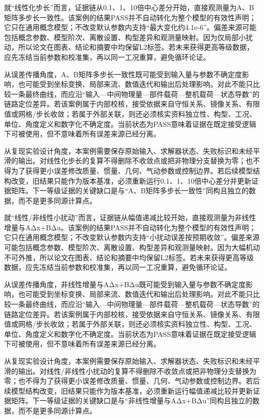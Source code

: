 \documentclass[UTF8,12pt,openany]{ctexbook}
\begin{document}
就“线性化步长”而言，证据链从0.1、1、10倍中心差分开始，直接观测量为A、B矩阵多步长一致性。该案例的结果PASS并不自动转化为整个模型的有效性声明；它只在通用概念模型；不改变默认参数内支持“最大变化约4.1e-6”。偏差来源可能包括概念参数、模型阶次、离散设置、构型差异和观测量映射。因为仅局部小扰动，所以论文在图表、结论和摘要中均保留L2标签。若未来获得更高等级数据，应先冻结当前参数和校准集，再以同一工况重算，避免循环论证。

从误差传播角度，A、B矩阵多步长一致性既可能受到输入量与参数不确定度影响，也可能受到坐标变换、局部来流、数值迭代和输出后处理影响。对此不能只比较一条最终曲线，而应沿“输入—中间物理量—部件载荷—整机载荷—状态导数”的链路定位差异。若该案例属于内部校核，接受依据来自守恒关系、镜像关系、有限值或网格/步长收敛；若属于外部关联，则还必须核实资料独立性、构型、工况、单位、角度定义和数字化不确定度。当前状态为PASS意味着证据在既定接受逻辑下可被使用，但不意味着所有误差来源已经分离。

从复现实验设计角度，本案例需要保存原始输入、求解器状态、失败标识和未经平滑的输出。对线性化步长的复算不得删除不收敛点或把非物理分支替换为零；也不得为了获得更小误差修改质量、惯量、几何、气动参数或控制边界。若后续模型结构改变，旧结果只能作为版本基准，必须重新运行0.1、1、10倍中心差分并更新证据矩阵。下一等级证据的关键缺口是与“A、B矩阵多步长一致性”同构且独立的数据，而不是更多同源计算点。

就“线性/非线性小扰动”而言，证据链从幅值递减比较开始，直接观测量为非线性增量与AΔx+BΔu。该案例的结果PASS并不自动转化为整个模型的有效性声明；它只在通用概念模型；不改变默认参数内支持“小扰动误差按预期收敛”。偏差来源可能包括概念参数、模型阶次、离散设置、构型差异和观测量映射。因为大幅机动不可外推，所以论文在图表、结论和摘要中均保留L2标签。若未来获得更高等级数据，应先冻结当前参数和校准集，再以同一工况重算，避免循环论证。

从误差传播角度，非线性增量与AΔx+BΔu既可能受到输入量与参数不确定度影响，也可能受到坐标变换、局部来流、数值迭代和输出后处理影响。对此不能只比较一条最终曲线，而应沿“输入—中间物理量—部件载荷—整机载荷—状态导数”的链路定位差异。若该案例属于内部校核，接受依据来自守恒关系、镜像关系、有限值或网格/步长收敛；若属于外部关联，则还必须核实资料独立性、构型、工况、单位、角度定义和数字化不确定度。当前状态为PASS意味着证据在既定接受逻辑下可被使用，但不意味着所有误差来源已经分离。

从复现实验设计角度，本案例需要保存原始输入、求解器状态、失败标识和未经平滑的输出。对线性/非线性小扰动的复算不得删除不收敛点或把非物理分支替换为零；也不得为了获得更小误差修改质量、惯量、几何、气动参数或控制边界。若后续模型结构改变，旧结果只能作为版本基准，必须重新运行幅值递减比较并更新证据矩阵。下一等级证据的关键缺口是与“非线性增量与AΔx+BΔu”同构且独立的数据，而不是更多同源计算点。
\end{document}
